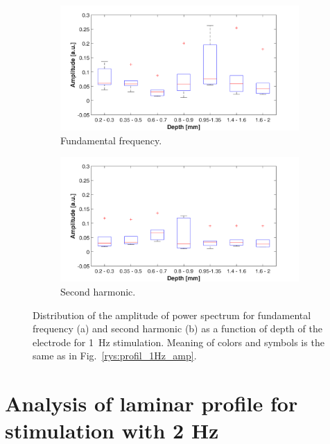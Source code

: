 \documentclass{pracalicmgr}
\begin{document}
    
    \begin{figure}[H]
    	\begin{subfigure}{.5\textwidth}
    		\centering
    		\includegraphics[width=1.\linewidth]{profile_1Hz_wid.png}
    		\caption{Fundamental frequency.}
    		\label{rys:profil_1Hz_wid1}
    	\end{subfigure}%
    	\begin{subfigure}{.5\textwidth}
    		\centering
    		\includegraphics[width=1.\linewidth]{profile_1Hz_wid2.png}
    		\caption{Second harmonic.}
    		\label{rys:profil_1Hz_wid2}
    	\end{subfigure}
    	
    	\caption{Distribution of the amplitude of power spectrum for fundamental frequency (a) and second harmonic (b) as a function of depth of the electrode for 1~Hz stimulation. Meaning of colors and symbols is the same as in Fig.~\ref{rys:profil_1Hz_amp}.}
    	\label{rys:profil_1Hz_wid}
    \end{figure}
    
 
 \section{Analysis of laminar profile for stimulation with 2 Hz}
  
\end{document}
